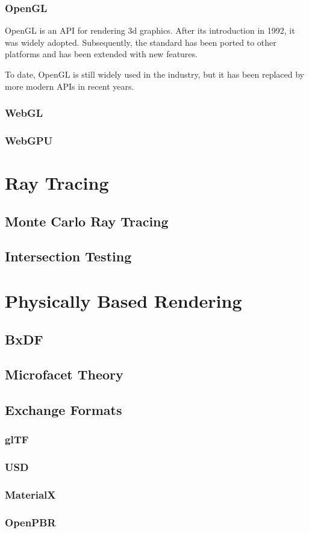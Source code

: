 \subsubsection{OpenGL}

OpenGL is an API for rendering 3d graphics. After its introduction in 1992, it was widely adopted. Subsequently, the standard has been ported to other platforms and has been extended with new features.

To date, OpenGL is still widely used in the industry, but it has been replaced by more modern APIs in recent years.

\subsubsection{WebGL}
\subsubsection{WebGPU}

\section{Ray Tracing}
\subsection{Monte Carlo Ray Tracing}
\subsection{Intersection Testing}

\section{Physically Based Rendering}
\subsection{BxDF}
\subsection{Microfacet Theory}
\subsection{Exchange Formats}
\subsubsection{glTF}
\subsubsection{USD}

\subsubsection{MaterialX}
\subsubsection{OpenPBR}
